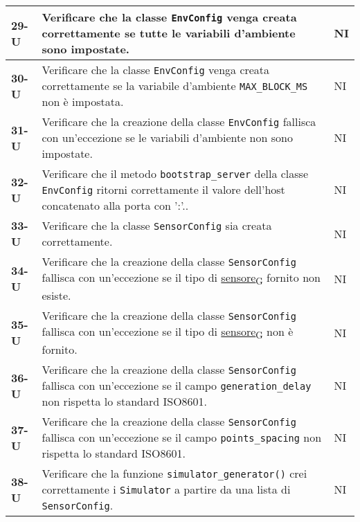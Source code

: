 \begin{longtable}{|>{\raggedright\arraybackslash}m{}|>{\raggedright\arraybackslash}m{}|>{\raggedright\arraybackslash}m{}|}
	\hline
	\textbf{29-U}   & Verificare che la classe \texttt{EnvConfig} venga creata correttamente se tutte le variabili d'ambiente sono impostate.                                           & NI             \\
	\hline
	\textbf{30-U}   & Verificare che la classe \texttt{EnvConfig} venga creata correttamente se la variabile d'ambiente \texttt{MAX\_BLOCK\_MS} non è impostata.                        & NI             \\
	\hline
	\textbf{31-U}   & Verificare che la creazione della classe \texttt{EnvConfig} fallisca con un'eccezione se le variabili d'ambiente non sono impostate.                              & NI             \\
	\hline
	\textbf{32-U}   & Verificare che il metodo \texttt{bootstrap\_server} della classe \texttt{EnvConfig} ritorni correttamente il valore dell'host concatenato alla porta con ':'..    & NI             \\
	\hline
	\textbf{33-U}   & Verificare che la classe \texttt{SensorConfig} sia creata correttamente.                                                                                          & NI             \\
	\hline
	\textbf{34-U}   & Verificare che la creazione della classe \texttt{SensorConfig} fallisca con un'eccezione se il tipo di \href{https://7last.github.io/docs/rtb/documentazione-interna/glossario\#sensore}{sensore\textsubscript{G}} fornito non esiste.                                & NI             \\
	\hline
	\textbf{35-U}   & Verificare che la creazione della classe \texttt{SensorConfig} fallisca con un'eccezione se il tipo di \href{https://7last.github.io/docs/rtb/documentazione-interna/glossario\#sensore}{sensore\textsubscript{G}} non è fornito.                                     & NI             \\
	\hline
	\textbf{36-U}   & Verificare che la creazione della classe \texttt{SensorConfig} fallisca con un'eccezione se il campo \texttt{generation\_delay} non rispetta lo standard ISO8601. & NI             \\
	\hline
	\textbf{37-U}   & Verificare che la creazione della classe \texttt{SensorConfig} fallisca con un'eccezione se il campo \texttt{points\_spacing} non rispetta lo standard ISO8601.   & NI             \\
	\hline
	\textbf{38-U}   & Verificare che la funzione \texttt{simulator\_generator()} crei correttamente i \texttt{Simulator} a partire da una lista di \texttt{SensorConfig}.               & NI             \\

\end{longtable}
